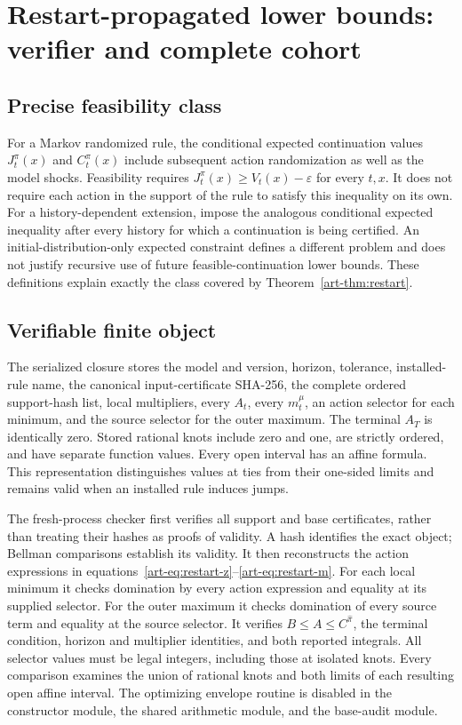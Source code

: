 \section{Restart-propagated lower bounds: verifier and complete cohort}\label{app:restart}
\subsection{Precise feasibility class}
For a Markov randomized rule, the conditional expected continuation values $J_t^\pi(x)$ and $C_t^\pi(x)$ include subsequent action randomization as well as the model shocks. Feasibility requires $J_t^\pi(x)\ge V_t(x)-\varepsilon$ for every $t,x$. It does not require each action in the support of the rule to satisfy this inequality on its own. For a history-dependent extension, impose the analogous conditional expected inequality after every history for which a continuation is being certified. An initial-distribution-only expected constraint defines a different problem and does not justify recursive use of future feasible-continuation lower bounds. These definitions explain exactly the class covered by Theorem~\ref{art-thm:restart}.

\subsection{Verifiable finite object}
The serialized closure stores the model and version, horizon, tolerance, installed-rule name, the canonical input-certificate SHA-256, the complete ordered support-hash list, local multipliers, every $A_t$, every $m_t^\mu$, an action selector for each minimum, and the source selector for the outer maximum. The terminal $A_T$ is identically zero. Stored rational knots include zero and one, are strictly ordered, and have separate function values. Every open interval has an affine formula. This representation distinguishes values at ties from their one-sided limits and remains valid when an installed rule induces jumps.

The fresh-process checker first verifies all support and base certificates, rather than treating their hashes as proofs of validity. A hash identifies the exact object; Bellman comparisons establish its validity. It then reconstructs the action expressions in equations~\eqref{art-eq:restart-z}--\eqref{art-eq:restart-m}. For each local minimum it checks domination by every action expression and equality at its supplied selector. For the outer maximum it checks domination of every source term and equality at the source selector. It verifies $B\le A\le C^{\widehat\pi}$, the terminal condition, horizon and multiplier identities, and both reported integrals. All selector values must be legal integers, including those at isolated knots. Every comparison examines the union of rational knots and both limits of each resulting open affine interval. The optimizing envelope routine is disabled in the constructor module, the shared arithmetic module, and the base-audit module.

